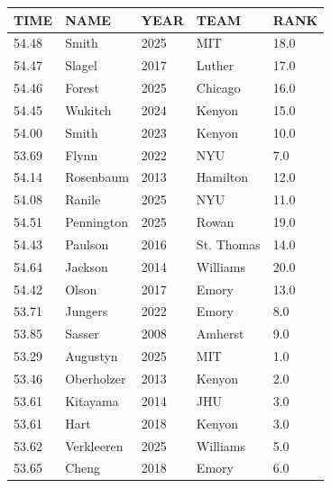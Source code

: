 \begin{table}[H]
\begin{minipage}[t]{0.48\textwidth}
\begin{tabular}{@{}p{1.8cm}p{2.8cm}p{1.2cm}p{1.4cm}p{0.8cm}@{}}
\hline
    \textbf{TIME} & \textbf{NAME} & \textbf{YEAR} & \textbf{TEAM} & \textbf{RANK} \\
\hline
    54.48 & Smith & 2025 & MIT & 18.0 \\
    54.47 & Slagel & 2017 & Luther & 17.0 \\
    54.46 & Forest & 2025 & Chicago & 16.0 \\
    54.45 & Wukitch & 2024 & Kenyon & 15.0 \\
    54.00 & Smith & 2023 & Kenyon & 10.0 \\
    53.69 & Flynn & 2022 & NYU & 7.0 \\
    54.14 & Rosenbaum & 2013 & Hamilton & 12.0 \\
    54.08 & Ranile & 2025 & NYU & 11.0 \\
    54.51 & Pennington & 2025 & Rowan & 19.0 \\
    54.43 & Paulson & 2016 & St. Thomas & 14.0 \\
    54.64 & Jackson & 2014 & Williams & 20.0 \\
    54.42 & Olson & 2017 & Emory & 13.0 \\
    53.71 & Jungers & 2022 & Emory & 8.0 \\
    53.85 & Sasser & 2008 & Amherst & 9.0 \\
    53.29 & Augustyn & 2025 & MIT & 1.0 \\
    53.46 & Oberholzer & 2013 & Kenyon & 2.0 \\
    53.61 & Kitayama & 2014 & JHU & 3.0 \\
    53.61 & Hart & 2018 & Kenyon & 3.0 \\
    53.62 & Verkleeren & 2025 & Williams & 5.0 \\
    53.65 & Cheng & 2018 & Emory & 6.0 \\
\hline
\end{tabular}
\end{minipage}
\end{table}


